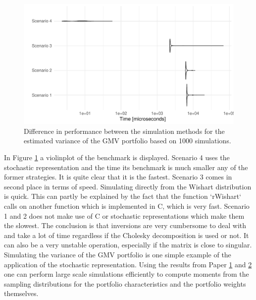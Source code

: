 \documentclass[12pt, oneside]{book}\usepackage{knitr}
\begin{document}
{\begin{knitrout}
\begin{figure}
{\centering \includegraphics[width=\maxwidth]{figure/microbenchmark_output-1} 

}

\caption[Difference in performance between the simulation methods for the estimated variance of the GMV portfolio based on 1000 simulations]{Difference in performance between the simulation methods for the estimated variance of the GMV portfolio based on 1000 simulations.}\label{fig:microbenchmark_output}
\end{figure}

\end{knitrout}

In Figure \ref{fig:microbenchmark_output} a violinplot of the benchmark is displayed.
Scenario 4 uses the stochastic representation and the time its benchmark is much smaller any of the former strategies.
It is quite clear that it is the fastest.
Scenario 3 comes in second place in terms of speed.
Simulating directly from the Wishart distribution is quick.
This can partly be explained by the fact that the function `rWishart` calls on another function which is implemented in C, which is very fast.
Scenario 1 and 2 does not make use of C or stochastic representations which make them the slowest.
The conclusion is that inversions are very cumbersome to deal with and take a lot of time regardless if the Cholesky decomposition is used or not.
It can also be a very unstable operation, especially if the matrix is close to singular.
Simulating the variance of the GMV portfolio is one simple example of the application of the stochastic representation.
Using the results from Paper \hyperref[sec:paper1]{1} and \hyperref[sec:paper2]{2} one can perform large scale simulations efficiently to compute moments from the sampling distributions for the portfolio characteristics and the portfolio weights themselves.

}
\end{document}
